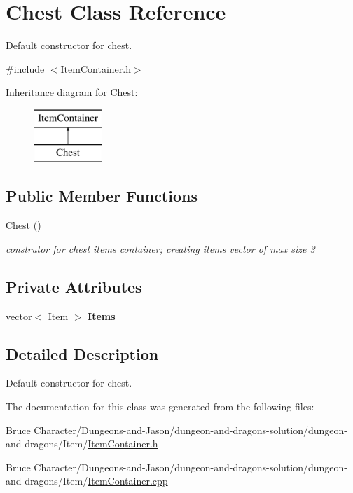 \hypertarget{class_chest}{}\section{Chest Class Reference}
\label{class_chest}


Default constructor for chest.  




{\ttfamily \#include $<$Item\+Container.\+h$>$}

Inheritance diagram for Chest\+:\begin{figure}[H]
\begin{center}
\leavevmode
\includegraphics[height=2.000000cm]{class_chest}
\end{center}
\end{figure}
\subsection*{Public Member Functions}
\begin{DoxyCompactItemize}
\item 
\hypertarget{class_chest_a7bc29748ccf0ba8e3fa0ff7d2c60e188}{}\label{class_chest_a7bc29748ccf0ba8e3fa0ff7d2c60e188} 
\hyperlink{class_chest_a7bc29748ccf0ba8e3fa0ff7d2c60e188}{Chest} ()
\begin{DoxyCompactList}\small\item\em construtor for chest items container; creating items vector of max size 3 \end{DoxyCompactList}\end{DoxyCompactItemize}
\subsection*{Private Attributes}
\begin{DoxyCompactItemize}
\item 
\hypertarget{class_chest_ab8cdaa403e64d295952c8aa0e159d6bb}{}\label{class_chest_ab8cdaa403e64d295952c8aa0e159d6bb} 
vector$<$ \hyperlink{class_item}{Item} $>$ {\bfseries Items}
\end{DoxyCompactItemize}


\subsection{Detailed Description}
Default constructor for chest. 

The documentation for this class was generated from the following files\+:\begin{DoxyCompactItemize}
\item 
Bruce Character/\+Dungeons-\/and-\/\+Jason/dungeon-\/and-\/dragons-\/solution/dungeon-\/and-\/dragons/\+Item/\hyperlink{_item_container_8h}{Item\+Container.\+h}\item 
Bruce Character/\+Dungeons-\/and-\/\+Jason/dungeon-\/and-\/dragons-\/solution/dungeon-\/and-\/dragons/\+Item/\hyperlink{_item_container_8cpp}{Item\+Container.\+cpp}\end{DoxyCompactItemize}
